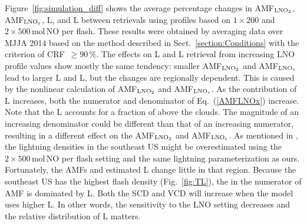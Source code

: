 \documentclass[amt]{copernicus}
\begin{document}
Figure~\ref{fig:simulation_diff} shows the average percentage changes in AMF$_{\chem{LNO_2}}$, AMF$_{\chem{LNO_\mathit{x}}}$, L, and L between retrievals using profiles based on $1\times200$ and $2\times500$\,mol\,NO per flash.
These results were obtained by averaging data over MJJA 2014 based on the method described in Sect.~\ref{section:Conditions} with the criterion of CRF~$\geq 90\,{\%}$.
The effects on L and L retrieval from increasing LNO profile values show mostly the same tendency: smaller AMF$_{\chem{LNO_2}}$ and AMF$_{\chem{LNO_\mathit{x}}}$ lead to larger L and L, but the changes are regionally dependent.
This is caused by the nonlinear calculation of AMF$_{\chem{LNO_2}}$ and AMF$_{\chem{LNO_\mathit{x}}}$.
As the contribution of L increases, both the numerator and denominator of Eq.~(\ref{AMFLNOx}) increase.
Note that the L accounts for a fraction of  above the clouds. The magnitude of an increasing denominator could be different than that of an increasing numerator, resulting in a different effect on the AMF$_{\chem{LNO_2}}$ and AMF$_{\chem{LNO_\mathit{x}}}$.
As mentioned in \citet{Zhu.2019}, the lightning densities in the southeast US might be overestimated using the $2\times500$\,mol\,NO per flash setting and the same lightning parameterization as ours.
Fortunately, the AMFs and estimated L change little in that region.
Because the southeast US has the highest flash density (Fig.~\ref{fig:TL}), the  in the numerator of AMF is dominated by L.
Both the SCD and VCD will increase when the model uses higher L.
In other words, the sensitivity to the LNO setting decreases and the relative distribution of L matters.
\end{document}
